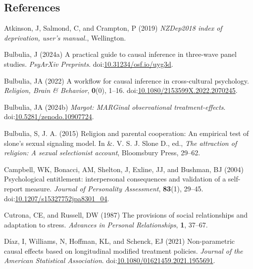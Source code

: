 \documentclass[
  single column]{article}
\newlength{\cslhangindent}
\newenvironment{CSLReferences}[2] %
 {\begin{list}{}{%
  \setlength{\itemindent}{0pt}
  \setlength{\leftmargin}{0pt}
  \setlength{\parsep}{0pt}
  \ifodd #1
   \setlength{\leftmargin}{\cslhangindent}
   \setlength{\itemindent}{-1\cslhangindent}
  \fi
  \setlength{\itemsep}{#2\baselineskip}}}
 {\end{list}}
\begin{document}
\subsection*{References}\label{references}

\label{refs}
\begin{CSLReferences}{1}{0}
Atkinson, J, Salmond, C, and Crampton, P (2019) \emph{NZDep2018 index of
deprivation, user{'}s manual.}, Wellington.

Bulbulia, J (2024a) A practical guide to causal inference in three-wave
panel studies. \emph{PsyArXiv Preprints}.
doi:\href{https://doi.org/10.31234/osf.io/uyg3d}{10.31234/osf.io/uyg3d}.

Bulbulia, JA (2022) A workflow for causal inference in cross-cultural
psychology. \emph{Religion, Brain \& Behavior}, \textbf{0}(0), 1--16.
doi:\href{https://doi.org/10.1080/2153599X.2022.2070245}{10.1080/2153599X.2022.2070245}.

Bulbulia, JA (2024b) \emph{Margot: MARGinal observational
treatment-effects}.
doi:\href{https://doi.org/10.5281/zenodo.10907724}{10.5281/zenodo.10907724}.

Bulbulia, S, J. A. (2015) Religion and parental cooperation: An
empirical test of slone's sexual signaling model. In \&. V. S. J. Slone
D., ed., \emph{The attraction of religion: A sexual selectionist
account}, Bloomsbury Press, 29--62.

Campbell, WK, Bonacci, AM, Shelton, J, Exline, JJ, and Bushman, BJ
(2004) Psychological entitlement: interpersonal consequences and
validation of a self-report measure. \emph{Journal of Personality
Assessment}, \textbf{83}(1), 29--45.
doi:\href{https://doi.org/10.1207/s15327752jpa8301_04}{10.1207/s15327752jpa8301\_04}.

Cutrona, CE, and Russell, DW (1987) The provisions of social
relationships and adaptation to stress. \emph{Advances in Personal
Relationships}, \textbf{1}, 37--67.

Díaz, I, Williams, N, Hoffman, KL, and Schenck, EJ (2021) Non-parametric
causal effects based on longitudinal modified treatment policies.
\emph{Journal of the American Statistical Association}.
doi:\href{https://doi.org/10.1080/01621459.2021.1955691}{10.1080/01621459.2021.1955691}.


\end{CSLReferences}
\end{document}
